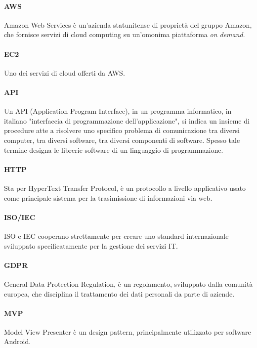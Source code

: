 \paragraph{AWS} Amazon Web Services è un'azienda statunitense di proprietà del gruppo Amazon, che fornisce servizi di cloud computing su un'omonima piattaforma \textit{on demand}.

\paragraph{EC2} Uno dei servizi di cloud offerti da AWS.

\paragraph{API} Un API (Application Program Interface), in un programma informatico, in italiano "interfaccia di programmazione dell'applicazione", si indica un insieme di procedure atte a risolvere uno specifico problema di comunicazione tra diversi computer, tra diversi software, tra diversi componenti di software.
Spesso tale termine designa le librerie software di un linguaggio di programmazione.

\paragraph{HTTP} Sta per HyperText Transfer Protocol, è un protocollo a livello applicativo usato come principale sistema per la trasimissione di informazioni via web.

\paragraph{ISO/IEC} ISO e IEC cooperano strettamente per creare uno standard internazionale sviluppato specificatamente per la gestione dei servizi IT.

\paragraph{GDPR} General Data Protection Regulation, è un regolamento, sviluppato dalla comunità europea, che disciplina il trattamento dei dati personali da parte di aziende.

\paragraph{MVP} Model View Presenter è un design pattern, principalmente utilizzato per software Android.

